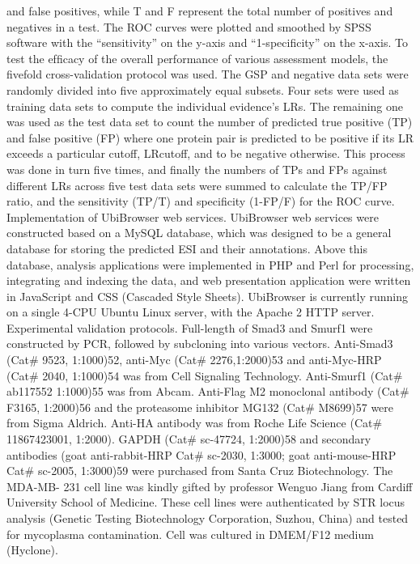 and false positives, while T and F represent the total number of positives and
negatives in a test. The ROC curves were plotted and smoothed by SPSS software
with the “sensitivity” on the y-axis and “1-speciﬁcity” on the x-axis.
To test the efﬁcacy of the overall performance of various assessment models, the
ﬁvefold cross-validation protocol was used. The GSP and negative data sets were
randomly divided into ﬁve approximately equal subsets. Four sets were used as
training data sets to compute the individual evidence’s LRs. The remaining one was
used as the test data set to count the number of predicted true positive (TP) and
false positive (FP) where one protein pair is predicted to be positive if its LR
exceeds a particular cutoff, LRcutoff, and to be negative otherwise. This process was
done in turn ﬁve times, and ﬁnally the numbers of TPs and FPs against different
LRs across ﬁve test data sets were summed to calculate the TP/FP ratio, and the
sensitivity (TP/T) and speciﬁcity (1-FP/F) for the ROC curve.
Implementation of UbiBrowser web services. UbiBrowser web services were
constructed based on a MySQL database, which was designed to be a general
database for storing the predicted ESI and their annotations. Above this database,
analysis applications were implemented in PHP and Perl for processing, integrating
and indexing the data, and web presentation application were written in
JavaScript and CSS (Cascaded Style Sheets). UbiBrowser is currently running on a
single 4-CPU Ubuntu Linux server, with the Apache 2 HTTP server.
Experimental validation protocols. Full-length of Smad3 and Smurf1 were
constructed by PCR, followed by subcloning into various vectors. Anti-Smad3
(Cat\# 9523, 1:1000)52, anti-Myc (Cat\# 2276,1:2000)53 and anti-Myc-HRP
(Cat\# 2040, 1:1000)54 was from Cell Signaling Technology. Anti-Smurf1
(Cat\# ab117552 1:1000)55 was from Abcam. Anti-Flag M2 monoclonal antibody
(Cat\# F3165, 1:2000)56 and the proteasome inhibitor MG132 (Cat\# M8699)57 were
from Sigma Aldrich. Anti-HA antibody was from Roche Life Science (Cat\#
11867423001, 1:2000). GAPDH (Cat\# sc-47724, 1:2000)58 and secondary
antibodies (goat anti-rabbit-HRP Cat\# sc-2030, 1:3000; goat anti-mouse-HRP Cat\#
sc-2005, 1:3000)59 were purchased from Santa Cruz Biotechnology. The MDA-MB-
231 cell line was kindly gifted by professor Wenguo Jiang from Cardiff University
School of Medicine. These cell lines were authenticated by STR locus analysis
(Genetic Testing Biotechnology Corporation, Suzhou, China) and tested for
mycoplasma contamination. Cell was cultured in DMEM/F12 medium (Hyclone).
